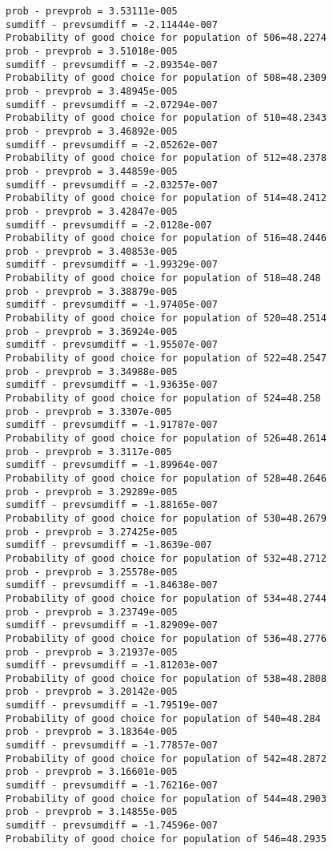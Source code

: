 \documentclass[11pt,onecolumn]{article}
\begin{document}
\begin{verbatim}
prob - prevprob = 3.53111e-005
sumdiff - prevsumdiff = -2.11444e-007
Probability of good choice for population of 506=48.2274
prob - prevprob = 3.51018e-005
sumdiff - prevsumdiff = -2.09354e-007
Probability of good choice for population of 508=48.2309
prob - prevprob = 3.48945e-005
sumdiff - prevsumdiff = -2.07294e-007
Probability of good choice for population of 510=48.2343
prob - prevprob = 3.46892e-005
sumdiff - prevsumdiff = -2.05262e-007
Probability of good choice for population of 512=48.2378
prob - prevprob = 3.44859e-005
sumdiff - prevsumdiff = -2.03257e-007
Probability of good choice for population of 514=48.2412
prob - prevprob = 3.42847e-005
sumdiff - prevsumdiff = -2.0128e-007
Probability of good choice for population of 516=48.2446
prob - prevprob = 3.40853e-005
sumdiff - prevsumdiff = -1.99329e-007
Probability of good choice for population of 518=48.248
prob - prevprob = 3.38879e-005
sumdiff - prevsumdiff = -1.97405e-007
Probability of good choice for population of 520=48.2514
prob - prevprob = 3.36924e-005
sumdiff - prevsumdiff = -1.95507e-007
Probability of good choice for population of 522=48.2547
prob - prevprob = 3.34988e-005
sumdiff - prevsumdiff = -1.93635e-007
Probability of good choice for population of 524=48.258
prob - prevprob = 3.3307e-005
sumdiff - prevsumdiff = -1.91787e-007
Probability of good choice for population of 526=48.2614
prob - prevprob = 3.3117e-005
sumdiff - prevsumdiff = -1.89964e-007
Probability of good choice for population of 528=48.2646
prob - prevprob = 3.29289e-005
sumdiff - prevsumdiff = -1.88165e-007
Probability of good choice for population of 530=48.2679
prob - prevprob = 3.27425e-005
sumdiff - prevsumdiff = -1.8639e-007
Probability of good choice for population of 532=48.2712
prob - prevprob = 3.25578e-005
sumdiff - prevsumdiff = -1.84638e-007
Probability of good choice for population of 534=48.2744
prob - prevprob = 3.23749e-005
sumdiff - prevsumdiff = -1.82909e-007
Probability of good choice for population of 536=48.2776
prob - prevprob = 3.21937e-005
sumdiff - prevsumdiff = -1.81203e-007
Probability of good choice for population of 538=48.2808
prob - prevprob = 3.20142e-005
sumdiff - prevsumdiff = -1.79519e-007
Probability of good choice for population of 540=48.284
prob - prevprob = 3.18364e-005
sumdiff - prevsumdiff = -1.77857e-007
Probability of good choice for population of 542=48.2872
prob - prevprob = 3.16601e-005
sumdiff - prevsumdiff = -1.76216e-007
Probability of good choice for population of 544=48.2903
prob - prevprob = 3.14855e-005
sumdiff - prevsumdiff = -1.74596e-007
Probability of good choice for population of 546=48.2935

\end{verbatim}
\end{document}
